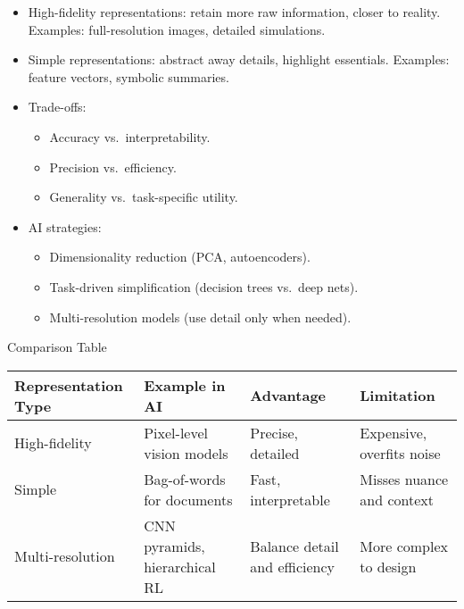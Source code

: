 \documentclass[
  letterpaper,
  DIV=11,
  numbers=noendperiod]{scrreprt}
\providecommand{\tightlist}{%
  \setlength{\itemsep}{0pt}\setlength{\parskip}{0pt}}
\begin{document}
\begin{itemize}
\item
  High-fidelity representations: retain more raw information, closer to
  reality. Examples: full-resolution images, detailed simulations.
\item
  Simple representations: abstract away details, highlight essentials.
  Examples: feature vectors, symbolic summaries.
\item
  Trade-offs:

  \begin{itemize}
  \tightlist
  \item
    Accuracy vs.~interpretability.
  \item
    Precision vs.~efficiency.
  \item
    Generality vs.~task-specific utility.
  \end{itemize}
\item
  AI strategies:

  \begin{itemize}
  \tightlist
  \item
    Dimensionality reduction (PCA, autoencoders).
  \item
    Task-driven simplification (decision trees vs.~deep nets).
  \item
    Multi-resolution models (use detail only when needed).
  \end{itemize}
\end{itemize}

Comparison Table

\begin{longtable}[]{@{}
  >{\raggedright\arraybackslash}p{}
  >{\raggedright\arraybackslash}p{}
  >{\raggedright\arraybackslash}p{}
  >{\raggedright\arraybackslash}p{}@{}}
\toprule\noalign{}
\begin{minipage}[b]{\linewidth}\raggedright
Representation Type
\end{minipage} & \begin{minipage}[b]{\linewidth}\raggedright
Example in AI
\end{minipage} & \begin{minipage}[b]{\linewidth}\raggedright
Advantage
\end{minipage} & \begin{minipage}[b]{\linewidth}\raggedright
Limitation
\end{minipage} \\
\midrule\noalign{}
\endhead
\bottomrule\noalign{}
\endlastfoot
High-fidelity & Pixel-level vision models & Precise, detailed &
Expensive, overfits noise \\
Simple & Bag-of-words for documents & Fast, interpretable & Misses
nuance and context \\
Multi-resolution & CNN pyramids, hierarchical RL & Balance detail and
efficiency & More complex to design \\
\end{longtable}
\end{document}
